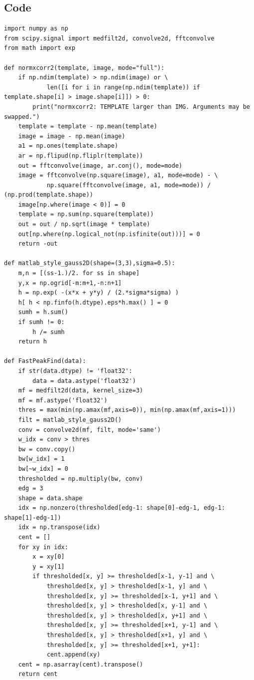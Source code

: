 \subsection{Code}
\begin{verbatim}
import numpy as np
from scipy.signal import medfilt2d, convolve2d, fftconvolve
from math import exp

def normxcorr2(template, image, mode="full"):
    if np.ndim(template) > np.ndim(image) or \
            len([i for i in range(np.ndim(template)) if template.shape[i] > image.shape[i]]) > 0:
        print("normxcorr2: TEMPLATE larger than IMG. Arguments may be swapped.")
    template = template - np.mean(template)
    image = image - np.mean(image)
    a1 = np.ones(template.shape)
    ar = np.flipud(np.fliplr(template))
    out = fftconvolve(image, ar.conj(), mode=mode)
    image = fftconvolve(np.square(image), a1, mode=mode) - \
            np.square(fftconvolve(image, a1, mode=mode)) / (np.prod(template.shape))
    image[np.where(image < 0)] = 0
    template = np.sum(np.square(template))
    out = out / np.sqrt(image * template)
    out[np.where(np.logical_not(np.isfinite(out)))] = 0
    return -out

def matlab_style_gauss2D(shape=(3,3),sigma=0.5):
    m,n = [(ss-1.)/2. for ss in shape]
    y,x = np.ogrid[-m:m+1,-n:n+1]
    h = np.exp( -(x*x + y*y) / (2.*sigma*sigma) )
    h[ h < np.finfo(h.dtype).eps*h.max() ] = 0
    sumh = h.sum()
    if sumh != 0:
        h /= sumh
    return h

def FastPeakFind(data):
    if str(data.dtype) != 'float32':
        data = data.astype('float32')
    mf = medfilt2d(data, kernel_size=3)
    mf = mf.astype('float32')
    thres = max(min(np.amax(mf,axis=0)), min(np.amax(mf,axis=1)))
    filt = matlab_style_gauss2D()
    conv = convolve2d(mf, filt, mode='same')
    w_idx = conv > thres
    bw = conv.copy()
    bw[w_idx] = 1
    bw[~w_idx] = 0
    thresholded = np.multiply(bw, conv)
    edg = 3
    shape = data.shape
    idx = np.nonzero(thresholded[edg-1: shape[0]-edg-1, edg-1: shape[1]-edg-1])
    idx = np.transpose(idx)
    cent = []
    for xy in idx:
        x = xy[0]
        y = xy[1]
        if thresholded[x, y] >= thresholded[x-1, y-1] and \
            thresholded[x, y] > thresholded[x-1, y] and \
            thresholded[x, y] >= thresholded[x-1, y+1] and \
            thresholded[x, y] > thresholded[x, y-1] and \
            thresholded[x, y] > thresholded[x, y+1] and \
            thresholded[x, y] >= thresholded[x+1, y-1] and \
            thresholded[x, y] > thresholded[x+1, y] and \
            thresholded[x, y] >= thresholded[x+1, y+1]:
            cent.append(xy)
    cent = np.asarray(cent).transpose()
    return cent


\end{verbatim}
